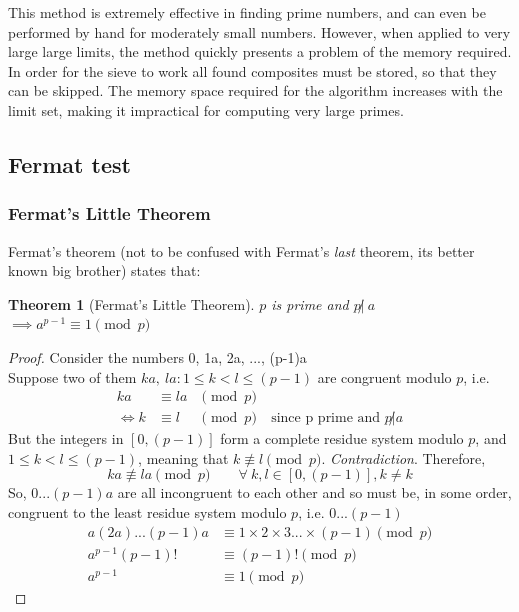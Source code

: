 \documentclass[12pt, titlepage]{article}
\newtheorem{theorem}{Theorem}
\begin{document}
    This method is extremely effective in finding prime numbers, and can even be performed
    by hand for moderately small numbers. However, when applied to very large large limits,
    the method quickly presents a problem of the memory required. In order for the sieve to
    work all found composites must be stored, so that they can be skipped. The memory space
    required for the algorithm increases with the limit set, making it impractical for
    computing very large primes.

           
    \subsection{Fermat test}

        \subsubsection{Fermat's Little Theorem}
        Fermat's theorem (not to be confused with Fermat's \emph{last} theorem, its better known
        big brother) states that:
        \begin{theorem}[Fermat's Little Theorem]
            $p$ is prime and $p \not|\ a$ $\implies a^{p-1} \equiv 1 \pmod{p}$
        \end{theorem}

        \begin{proof}
            Consider the numbers 0, 1a, 2a, ..., (p-1)a\\
            Suppose two of them $ka,\ la: 1\leq k < l \leq (p-1)$ are congruent modulo $p$, i.e.        %
            \begin{align*}
                      ka &\equiv la &\pmod{p}&\\
                \iff  k  &\equiv l  &\pmod{p}&\ \text{since p prime and $p \not| a$}
            \end{align*}
            But the integers in $[0, (p-1)]$ form a complete residue system modulo $p$, and  $1
            \leq k<l \leq (p-1)$, meaning that $k \not\equiv l \pmod p$. \emph{Contradiction}.
            Therefore,
            \begin{equation*}
                ka \not\equiv la \pmod{p}\qquad \forall\ k,l \in [0, (p-1)], k \not= k
            \end{equation*}
            So, $0...(p-1)a$ are all incongruent to each other and so must be, in some order,
            congruent to the least residue system modulo $p$, i.e.  $0...(p-1)$
            \begin{align*}
                a(2a)...(p-1)a &\equiv 1\times 2\times 3...\times (p-1) \pmod{p}\\
                a^{p-1}(p-1)!  &\equiv (p-1)!                           \pmod{p}\\
                a^{p-1}        &\equiv 1                                \pmod{p}
            \end{align*}
        \end{proof}
\end{document}
